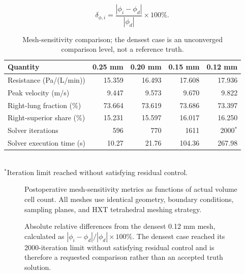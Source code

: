 \documentclass[11pt,a4paper]{article}
\begin{document}
\begin{equation}
  \delta_{\phi,i} =
  \frac{|\phi_i-\phi_d|}{|\phi_d|}\times 100\%.
  \label{eq:mesh_difference}
\end{equation}

\begin{table}[htbp]
  \centering
  \caption{Mesh-sensitivity comparison; the densest case is an unconverged
  comparison level, not a reference truth.}
  \label{tab:mesh_independence}
  \begin{tabular}{@{}lrrrr@{}}
    \toprule
    Quantity & 0.25 mm & 0.20 mm & 0.15 mm & 0.12 mm \\
    \midrule
    Resistance (Pa/(L/min)) & 15.359 & 16.493 & 17.608 & 17.936 \\
    Peak velocity (m/s) & 9.447 & 9.573 & 9.670 & 9.822 \\
    Right-lung fraction (\%) & 73.664 & 73.619 & 73.686 & 73.397 \\
    Right-superior share (\%) & 15.231 & 15.597 & 16.017 & 16.250 \\
    Solver iterations & 596 & 770 & 1611 & 2000$^*$ \\
    Solver execution time (s) & 10.27 & 21.76 & 104.36 & 267.98 \\
    \bottomrule
  \end{tabular}
  \\[2pt]\footnotesize{$^*$Iteration limit reached without satisfying residual control.}
\end{table}

\begin{figure}[htbp]
  \centering
  \resizebox{0.98\textwidth}{!}{}
  \caption{Postoperative mesh-sensitivity metrics as functions of actual volume
  cell count. All meshes use identical geometry, boundary conditions, sampling
  planes, and HXT tetrahedral meshing strategy.}
  \label{fig:mesh_sensitivity}
\end{figure}

\begin{figure}[htbp]
  \centering
  \resizebox{0.98\textwidth}{!}{}
  \caption{Absolute relative differences from the densest 0.12 mm mesh,
  calculated as $|\phi_i-\phi_d|/|\phi_d|\times100\%$. The densest case reached
  its 2000-iteration limit without satisfying residual control and is therefore
  a requested comparison rather than an accepted truth solution.}
  \label{fig:mesh_sensitivity_differences}
\end{figure}
\end{document}
